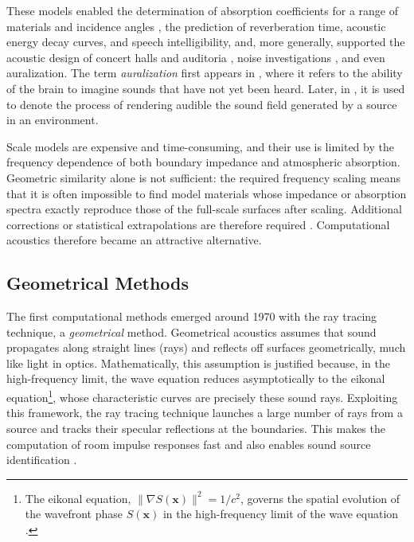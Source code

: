 \documentclass{Configuration_Files/PoliMi3i_thesis}
\newif\ifshowthesischanges
\DeclareRobustCommand{\thesischange}[2]{%
    \ifshowthesischanges
        \textcolor{#1}{#2}%
    \else
        #2%
    \fi
}
\def\thesischange#1#2{#2}%
\begin{document}
These models enabled the determination of absorption coefficients for a range of materials and incidence angles \citep{hunt_investigation_1939}, the prediction of reverberation time, acoustic energy decay curves, and speech intelligibility, and, more generally, supported the acoustic design of concert halls and auditoria \citep{hardy_techniques_1950,knudsen_model_1969}, noise investigations \citep{morgan_use_1961}, and even auralization. The term \emph{auralization} first appears in \cite{martin_you_1952}, where it refers to the ability of the brain to imagine sounds that have not yet been heard. Later, in \cite{kleiner_auralization_1993}, it is used to denote the process of rendering audible the sound field generated by a source in an environment.

Scale models are expensive and time-consuming, and their use is limited by the frequency dependence of both boundary impedance and atmospheric absorption. Geometric similarity alone is not sufficient: the required frequency scaling means that it is often impossible to find model materials whose impedance or absorption spectra exactly reproduce those of the full-scale surfaces after scaling. Additional corrections or statistical extrapolations are therefore required \citep{hunt_investigation_1939}. Computational acoustics therefore became an attractive alternative.

\subsection{Geometrical Methods}
The first computational methods emerged around 1970 with the ray tracing technique, a \emph{geometrical} method. Geometrical acoustics assumes that sound propagates along straight lines (rays) and reflects off surfaces geometrically, much like light in optics. Mathematically, this assumption is justified because, in the high-frequency limit, the wave equation reduces asymptotically to the eikonal equation\footnote{\thesischange{red}{The eikonal equation, $\|\nabla S(\mathbf{x})\|^2 = 1/c^2$, governs the spatial evolution of the wavefront phase $S(\mathbf{x})$ in the high-frequency limit of the wave equation \citep{potter_numerical_2023}.}}, whose characteristic curves are precisely these sound rays. Exploiting this framework, the ray tracing technique launches a large number of rays from a source and tracks their specular reflections at the boundaries. This makes the computation of room impulse responses fast \citep{krokstad_calculating_1968,schroeder_digital_1970,schroeder_computer_1973} and also enables sound source identification \citep{luzzato_simple_1986}.
\end{document}
